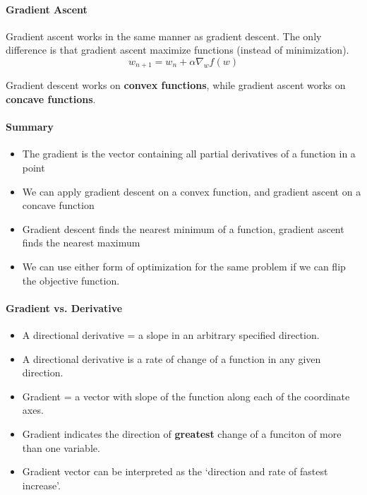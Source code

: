 \documentclass[sutton_barto_notes.tex]{subfiles}
\begin{document}
\paragraph{Gradient Ascent}
Gradient ascent works in the same manner as gradient descent. The only difference is that gradient ascent maximize functions (instead of minimization).
$$ w_{n+1} = w_n + \alpha \nabla_w f(w) $$

Gradient descent works on \textbf{convex functions}, while gradient ascent works on \textbf{concave functions}.

\paragraph{Summary}
\begin{itemize}
\item The gradient is the vector containing all partial derivatives of a function in a point
\item We can apply gradient descent on a convex function, and gradient ascent on a concave function
\item Gradient descent finds the nearest minimum of a function, gradient ascent finds the nearest maximum
\item We can use either form of optimization for the same problem if we can flip the objective function.
\end{itemize}

\paragraph{Gradient vs. Derivative}

\begin{itemize}
\item A directional derivative = a slope in an arbitrary specified direction.
\item A directional derivative is a rate of change of a function in any given direction.
\end{itemize}

\begin{itemize}
\item Gradient = a vector with slope of the function along each of the coordinate axes.
\item Gradient indicates the direction of \textbf{greatest} change of a funciton of more than one variable.
\item Gradient vector can be interpreted as the `direction and rate of fastest increase'.
\end{itemize}
\end{document}
